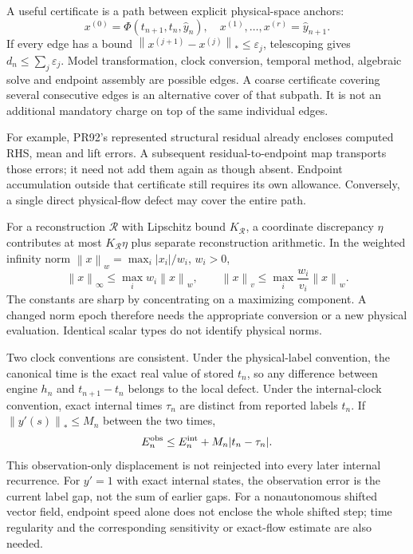 \documentclass[aps,pra,reprint,onecolumn,10pt,notitlepage,nofootinbib]{revtex4-2}
\newcommand{\norm}[1]{\left\|#1\right\|}
\newcommand{\eps}{\varepsilon}
\begin{document}
A useful certificate is a path between explicit physical-space anchors:
\begin{equation}
 x^{(0)}=\Phi(t_{n+1},t_n,\widehat y_n),\quad
 x^{(1)},\ldots,x^{(r)}=\widehat y_{n+1}.
\end{equation}
If every edge has a bound
$\norm{x^{(j+1)}-x^{(j)}}_*\le\eps_j$, telescoping gives
$d_n\le\sum_j\eps_j$. Model transformation, clock conversion, temporal
method, algebraic solve and endpoint assembly are possible edges. A coarse
certificate covering several consecutive edges is an alternative cover of
that subpath. It is not an additional mandatory charge on top of the same
individual edges.

For example, PR92's represented structural residual already encloses computed
RHS, mean and lift errors. A subsequent residual-to-endpoint map transports
those errors; it need not add them again as though absent. Endpoint accumulation
outside that certificate still requires its own allowance. Conversely, a
single direct physical-flow defect may cover the entire path.

For a reconstruction $\mathcal R$ with Lipschitz bound $K_{\mathcal R}$,
a coordinate discrepancy $\eta$ contributes at most $K_{\mathcal R}\eta$
plus separate reconstruction arithmetic. In the weighted infinity norm
$\norm{x}_w=\max_i|x_i|/w_i$, $w_i>0$,
\begin{equation}
 \norm{x}_\infty\le\max_iw_i\norm{x}_w,
 \qquad
 \norm{x}_v\le\max_i\frac{w_i}{v_i}\norm{x}_w.               \label{eq:norms}
\end{equation}
The constants are sharp by concentrating on a maximizing component. A changed
norm epoch therefore needs the appropriate conversion or a new physical
evaluation. Identical scalar types do not identify physical norms.

Two clock conventions are consistent. Under the physical-label convention,
the canonical time is the exact real value of stored $t_n$, so any difference
between engine $h_n$ and $t_{n+1}-t_n$ belongs to the local defect. Under the
internal-clock convention, exact internal times $\tau_n$ are distinct from
reported labels $t_n$. If $\norm{y'(s)}_*\le M_n$ between the two times,
\begin{equation}
 E_n^{\rm obs}\le E_n^{\rm int}+M_n|t_n-\tau_n|.             \label{eq:clock}
\end{equation}
This observation-only displacement is not reinjected into every later
internal recurrence. For $y'=1$ with exact internal states, the observation
error is the current label gap, not the sum of earlier gaps. For a
nonautonomous shifted vector field, endpoint speed alone does not enclose
the whole shifted step; time regularity and the corresponding sensitivity
or exact-flow estimate are also needed.
\end{document}
